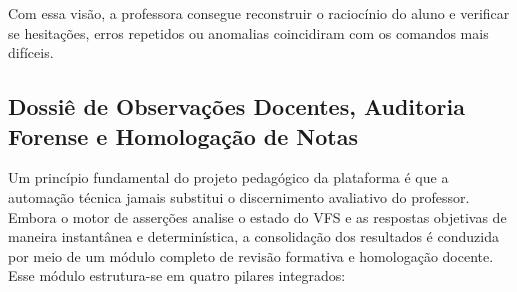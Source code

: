 Com essa visão, a professora consegue reconstruir o raciocínio do aluno e verificar se hesitações, erros repetidos ou anomalias coincidiram com os comandos mais difíceis.

\subsection{Dossiê de Observações Docentes, Auditoria Forense e Homologação de Notas}
\label{sec:dossie-docente}

Um princípio fundamental do projeto pedagógico da plataforma é que a automação técnica jamais substitui o discernimento avaliativo do professor. Embora o motor de asserções analise o estado do VFS e as respostas objetivas de maneira instantânea e determinística, a consolidação dos resultados é conduzida por meio de um módulo completo de revisão formativa e homologação docente. Esse módulo estrutura-se em quatro pilares integrados:

